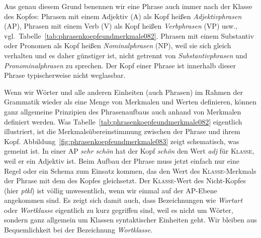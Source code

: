 Aus genau diesem Grund benennen wir eine Phrase auch immer nach der Klasse des Kopfes:
Phrasen mit einem Adjektiv (A) als Kopf heißen \textit{Adjektivphrasen} (AP), Phrasen mit einem Verb (V) als Kopf heißen \textit{Verbphrasen} (VP) usw., vgl.\ Tabelle~\ref{tab:phrasenkoepfeundmerkmale082}.
Phrasen mit einem Substantiv oder Pronomen als Kopf heißen \textit{Nominalphrasen} (NP), weil sie sich gleich verhalten und es daher günstiger ist, nicht getrennt von \textit{Substantivphrasen} und \textit{Pronominalphrasen} zu sprechen.
Der Kopf einer Phrase ist innerhalb dieser Phrase typischerweise nicht weglassbar.\label{abs:phrasenkoepfeundmerkmale081}

\begin{table}[!htbp]
  \caption{Phrasenbezeichnungen nach ihren Köpfen, die in den Beispielen fett gedruckt sind}
  \label{tab:phrasenkoepfeundmerkmale082}
\end{table}

Wenn wir Wörter und alle anderen Einheiten (auch Phrasen) im Rahmen der Grammatik wieder als eine Menge von Merkmalen und Werten definieren, können ganz allgemeine Prinzipien des Phrasenaufbaus auch anhand von Merkmalen definiert werden.
Was Tabelle~\ref{tab:phrasenkoepfeundmerkmale082} eigentlich illustriert, ist die Merkmalsübereinstimmung zwischen der Phrase und ihrem Kopf.
Abbildung~\ref{fig:phrasenkoepfeundmerkmale083} zeigt schematisch, was gemeint ist.
In einer AP \textit{sehr schön} hat der Kopf \textit{schön} den Wert \textit{adj} für \textsc{Klasse}, weil er ein Adjektiv ist.
Beim Aufbau der Phrase muss jetzt einfach nur eine Regel oder ein Schema zum Einsatz kommen, das den Wert des \textsc{Klasse}-Merkmals der Phrase mit dem des Kopfes gleichsetzt.
Der \textsc{Klasse}-Wert des Nicht-Kopfes (hier \textit{ptkl}) ist völlig unwesentlich, wenn wir einmal auf der AP-Ebene angekommen sind.
Es zeigt sich damit auch, dass Bezeichnungen wie \textit{Wortart} oder \textit{Wortklasse} eigentlich zu kurz gegriffen sind, weil es nicht um Wörter, sondern ganz allgemein um Klassen syntaktischer Einheiten geht.
Wir bleiben aus Bequemlichkeit bei der Bezeichnung \textit{Wortklasse}.

